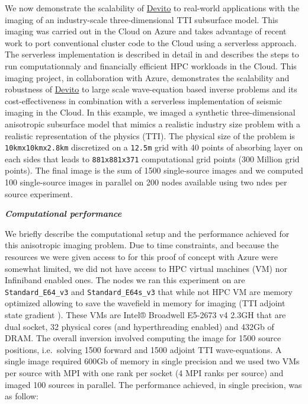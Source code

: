 \documentclass[conference]{IEEEtran}
\begin{document}
We now demonstrate the scalability of
\href{https://github.com/devitocodes/devito}{Devito} to real-world
applications with the imaging of an industry-scale three-dimensional TTI
subsurface model. This imaging was carried out in the Cloud on Azure and
takes advantage of recent work to port conventional cluster code to the
Cloud using a serverless approach. The serverless implementation is
described in detail in \cite{witte2019TPDedas, witte2019SEGedw} and
describes the steps to run computationnaly and financially efficient HPC
workloads in the Cloud. This imaging project, in collaboration with
Azure, demonstrates the scalability and robustness of
\href{https://github.com/devitocodes/devito}{Devito} to large scale
wave-equation based inverse problems and its cost-effectiveness in
combination with a serverless implementation of seismic imaging in the
Cloud. In this example, we imaged a synthetic three-dimensional
anisotropic subsurface model that mimics a realistic industry size
problem with a realistic representation of the physics (TTI). The
physical size of the problem is \texttt{10kmx10kmx2.8km} discretized on
a \texttt{12.5m} grid with 40 points of absorbing layer on each sides
that leads to \texttt{881x881x371} computational grid points (300
Million grid points). The final image is the sum of 1500 single-source
images and we computed 100 single-source images in parallel on 200 nodes
available using two ndes per source experiment.

\textbf{\emph{Computational performance}}

We briefly describe the computational setup and the performance achieved
for this anisotropic imaging problem. Due to time constraints, and
because the resources we were given access to for this proof of concept
with Azure were somewhat limited, we did not have access to HPC virtual
machines (VM) nor Infiniband enabled ones. The nodes we ran this
experiment on are \texttt{Standard\_E64\_v3} and
\texttt{Standard\_E64s\_v3} that while not HPC VM are memory optimized
allowing to save the wavefield in memory for imaging (TTI adjoint state
gradient \cite{virieux, louboutin2018segeow}). These VMs are Intel®
Broadwell E5-2673 v4 2.3GH that are dual socket, 32 physical cores (and
hyperthreading enabled) and 432Gb of DRAM. The overall inversion
involved computing the image for 1500 source positions, i.e.~solving
1500 forward and 1500 adjoint TTI wave-equations. A single image
required 600Gb of memory in single precision and we used two VMs per
source with MPI with one rank per socket (4 MPI ranks per source) and
imaged 100 sources in parallel. The performance achieved, in single
precision, was as follow:
\end{document}
